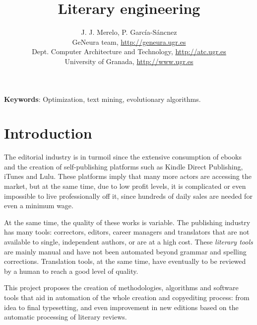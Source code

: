 \documentclass[a4paper]{article}
\begin{document}
\title{Literary engineering}

\author{J. J. Merelo, P. García-Sáncnez\\
GeNeura team, \url{http://geneura.ugr.es}\\
Dept. Computer Architecture and Technology, \url{http://atc.ugr.es}\\
University of Granada, \url{http://www.ugr.es}}

\onecolumn \maketitle \normalsize 



{\bf Keywords}: Optimization, text mining, evolutionary
algorithms.

\section{Introduction}

The editorial industry is in turmoil since the extensive consumption
of ebooks and the creation of self-publishing platforms such as Kindle
Direct Publishing, iTunes and Lulu. These platforms imply that many more actors are accessing the market, but at the same time, due to low profit levels, it is complicated or even impossible to live professionally off it, since hundreds of daily sales are needed for even a minimum wage.

At the same time, the quality of these works is variable. The
publishing industry has many tools: correctors, editors, career
managers and translators that are not available to single, independent
authors, or are at a high cost. These {\em literary tools} are mainly manual and have not been
automated beyond grammar and spelling corrections. Translation tools,
at the same time, have eventually to be reviewed by a human to reach a
good level of quality. 

This project proposes the creation of methodologies, algorithms and
software tools that aid in automation of the whole creation and
copyediting process:
from idea to final typesetting, and even improvement in new editions
based on the automatic processing of literary reviews. 
\end{document}
